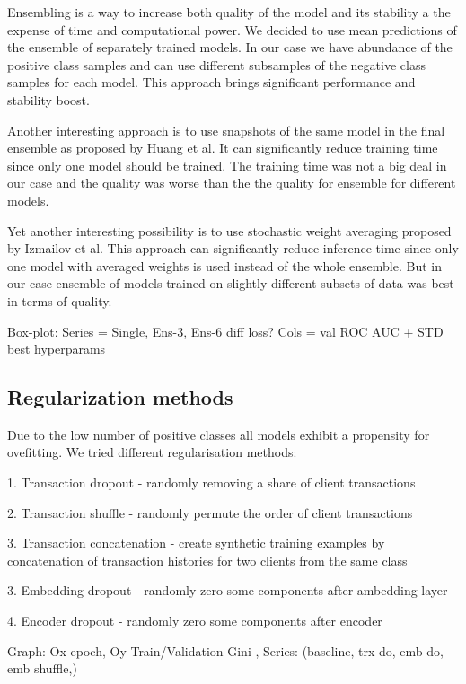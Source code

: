 \documentclass{sigkddExp}
\begin{document}
Ensembling is a way to increase both quality of the model and its stability a the expense of time and computational power. We decided to use mean predictions of the ensemble of separately trained models. In our case we have abundance of the positive class samples and can use different subsamples of the negative class samples for each model. This approach brings significant performance and stability boost.

Another interesting approach is to use snapshots of the same model in the final ensemble as proposed by Huang et al.\cite{DBLP:journals/corr/HuangLPLHW17} It can significantly reduce training time since only one model should be trained. The training time was not a big deal in our case and the quality was worse than the the quality for ensemble for different models.

Yet another interesting possibility is to use stochastic weight averaging proposed by Izmailov et al.\cite{DBLP:journals/corr/LoshchilovH16a} This approach can significantly reduce inference time since only one model with averaged weights is used instead of the whole ensemble. But in our case ensemble of models trained on slightly different subsets of data was best in terms of quality.

Box-plot: Series = {Single, Ens-3, Ens-6  diff loss? } Cols = {val ROC AUC + STD}
best hyperparams


\subsection{Regularization methods}

Due to the low number of positive classes all models exhibit a propensity for ovefitting. We tried different regularisation methods:

1. Transaction dropout - randomly removing a share of client transactions

2. Transaction shuffle - randomly permute the order of client transactions

3. Transaction concatenation - create synthetic training examples by concatenation of 
transaction histories for two clients from the same class

3. Embedding dropout - randomly zero some components after ambedding layer

4. Encoder dropout - randomly zero some components after encoder




Graph: Ox-epoch, Oy-Train/Validation Gini , Series: (baseline, trx do, emb do, emb shuffle,)
\end{document}
